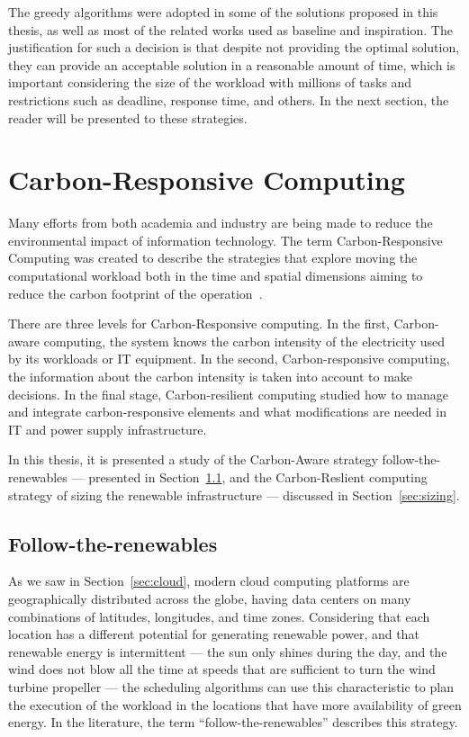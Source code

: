 The greedy algorithms were adopted in some of the solutions proposed in this thesis, as well as most of the related works used as baseline and inspiration. The justification for such a decision is that despite not providing the optimal solution, they can provide an acceptable solution in a reasonable amount of time, which is important considering the size of the workload with millions of tasks and restrictions such as deadline, response time, and others. In the next section, the reader will be presented to these strategies.

\section{Carbon-Responsive Computing}

\label{sec:carbon_responsive}

Many efforts from both academia and industry are being made to reduce the environmental impact of information technology. The term Carbon-Responsive Computing was created to describe the strategies that explore moving the computational workload both in the time and spatial dimensions aiming to reduce the carbon footprint of the operation~\cite{schooler2021carbonaware}.


There are three levels for Carbon-Responsive computing. In the first, Carbon-aware computing, the system knows the carbon intensity of the electricity used by its workloads or IT equipment. In the second, Carbon-responsive computing, the information about the carbon intensity is taken into account to make decisions. In the final stage, Carbon-resilient computing studied how to manage and integrate carbon-responsive elements and what modifications are needed in IT and power supply infrastructure.

In this thesis, it is presented a study of the Carbon-Aware strategy follow-the-renewables --- presented in Section~\ref{sec:followtherenewables}, and the Carbon-Reslient computing strategy of sizing the renewable infrastructure --- discussed in Section~\ref{sec:sizing}.

\subsection{Follow-the-renewables}

\label{sec:followtherenewables}

As we saw in Section~\ref{sec:cloud}, modern cloud computing platforms are geographically distributed across the globe, having data centers on many combinations of latitudes, longitudes, and time zones. Considering that each location has a different potential for generating renewable power, and that renewable energy is intermittent --- the sun only shines during the day, and the wind does not blow all the time at speeds that are sufficient to turn the wind turbine propeller --- the scheduling algorithms can use this characteristic to plan the execution of the workload in the locations that have more availability of green energy. In the literature, the term ``follow-the-renewables'' \cite{shuja2016sustainable} describes this strategy. 


